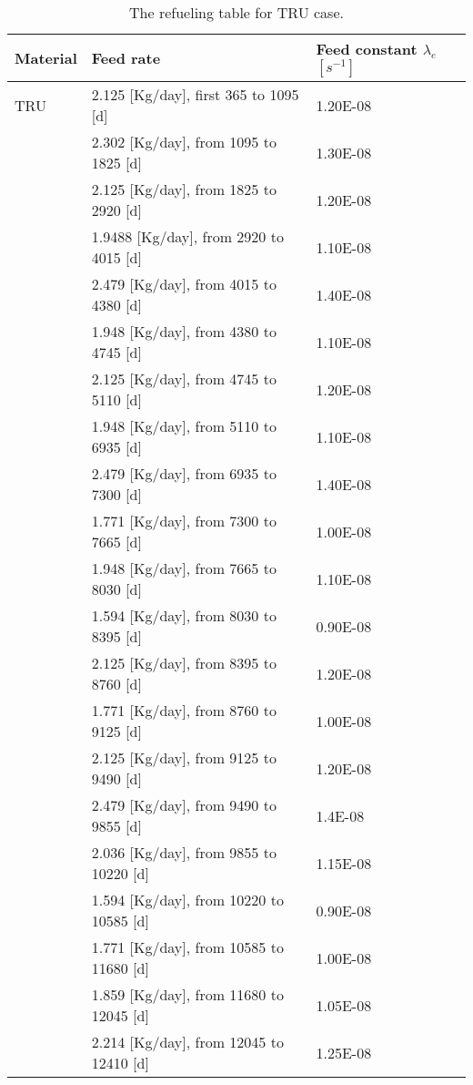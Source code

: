 \newpage
\begin{longtable}{|p{}|p{}|p{}|}
	\caption{The refueling table for TRU case.} 
	\vspace{-0.2in}
	\label{tab:table10}
	\endfirsthead
	\endhead
		\hline
		\textbf{Material} & \textbf{Feed rate} & \textbf{Feed 
		constant} $\lambda_{e}$ $[s^{-1}]$ \\
		\hline
		TRU        &  2.125 [Kg/day], first 365 to 1095  [d] & 1.20E-08 \\
		&  2.302  [Kg/day], from 1095 to 1825 [d] & 		1.30E-08 \\
		&  2.125  [Kg/day], from 1825 to 2920 [d] & 		1.20E-08 \\
		&  1.9488 [Kg/day], from 2920 to 4015 [d]& 		1.10E-08	\\
		&  2.479 [Kg/day], from 4015 to 4380 [d] &		1.40E-08	\\
		&  1.948 [Kg/day], from 4380 to 4745 [d] &		1.10E-08	\\
		&  2.125   [Kg/day], from 4745 to 5110 [d] &	1.20E-08	\\
		&  1.948   [Kg/day], from 5110 to 6935 [d]&		1.10E-08		\\
		&  2.479  [Kg/day], from 6935 to 7300 [d]&		1.40E-08	 \\ 
		&  1.771   [Kg/day], from 7300 to 7665 [d]&		1.00E-08	 \\ 
		&  1.948   [Kg/day], from 7665 to 8030 [d]&		1.10E-08	 \\ 
		&  1.594   [Kg/day], from 8030 to 8395 [d]&		0.90E-08	 \\
		&  2.125   [Kg/day], from 8395 to 8760 [d]&		1.20E-08	 \\
		&  1.771  [Kg/day], from 8760 to 9125 [d]&		1.00E-08	 \\
		& 2.125  [Kg/day], from 9125 to 9490 [d]&		1.20E-08	 \\
		&  2.479  [Kg/day], from 9490 to 9855 [d]&		1.4E-08	 \\
		&   2.036 [Kg/day], from 9855 to 10220 [d]&		1.15E-08	 \\
		&  1.594 [Kg/day], from 10220 to 10585 [d]&		0.90E-08	 \\
		&   1.771  [Kg/day], from 10585 to 11680 [d]&		1.00E-08	 \\
		&  1.859   [Kg/day], from 11680 to 12045 [d]&		1.05E-08	 \\
		& 2.214    [Kg/day], from 12045 to 12410 [d]&		1.25E-08	 \\

\end{longtable}
